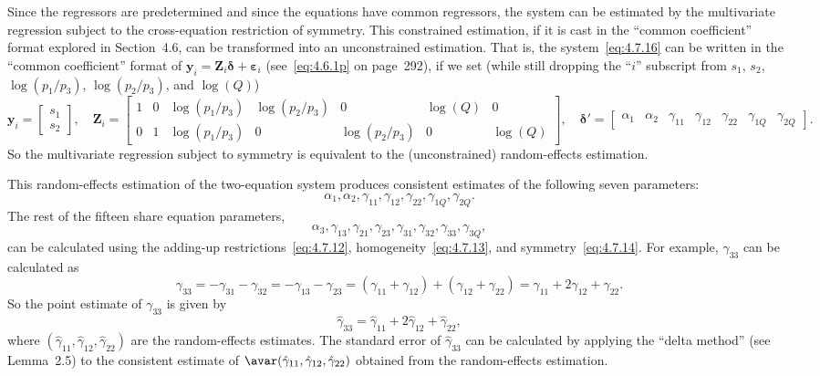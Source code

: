 Since the regressors are predetermined and since the equations have common
regressors, the system can be estimated by the multivariate regression subject to
the cross-equation restriction of symmetry. This constrained estimation, if it is cast
in the ``common coefficient'' format explored in Section~4.6, can be transformed
into an unconstrained estimation. That is, the system~\eqref{eq:4.7.16} can be
written in the ``common coefficient'' format of
$\mathbf{y}_i = \mathbf{Z}_i \boldsymbol{\delta} + \boldsymbol{\varepsilon}_i$
(see~\eqref{eq:4.6.1p} on page~292), if we set (while still dropping the ``$i$''
subscript from $s_1$, $s_2$, $\log(p_1/p_3)$, $\log(p_2/p_3)$, and $\log(Q)$)
\begin{equation}
\mathbf{y}_i = \begin{bmatrix} s_1 \\ s_2 \end{bmatrix}, \quad
\mathbf{Z}_i = \begin{bmatrix}
1 & 0 & \log(p_1/p_3) & \log(p_2/p_3) & 0 & \log(Q) & 0 \\
0 & 1 & \log(p_1/p_3) & 0 & \log(p_2/p_3) & 0 & \log(Q)
\end{bmatrix},
\quad
\boldsymbol{\delta}' = \begin{bmatrix}
\alpha_1 & \alpha_2 & \gamma_{11} & \gamma_{12} & \gamma_{22} &
\gamma_{1Q} & \gamma_{2Q}
\end{bmatrix}.
\label{eq:4.7.17}
\end{equation}
So the multivariate regression subject to symmetry is equivalent to the (unconstrained)
random-effects estimation.

This random-effects estimation of the two-equation system produces consistent
estimates of the following seven parameters:
\[
\alpha_1, \alpha_2, \gamma_{11}, \gamma_{12}, \gamma_{22},
\gamma_{1Q}, \gamma_{2Q}.
\]
The rest of the fifteen share equation parameters,
\[
\alpha_3, \gamma_{13}, \gamma_{21}, \gamma_{23}, \gamma_{31}, \gamma_{32},
\gamma_{33}, \gamma_{3Q},
\]
can be calculated using the adding-up restrictions~\eqref{eq:4.7.12},
homogeneity~\eqref{eq:4.7.13}, and symmetry~\eqref{eq:4.7.14}.
For example, $\gamma_{33}$ can be calculated as
\[
\gamma_{33} = -\gamma_{31} - \gamma_{32}
= -\gamma_{13} - \gamma_{23}
= (\gamma_{11} + \gamma_{12}) + (\gamma_{12} + \gamma_{22})
= \gamma_{11} + 2\gamma_{12} + \gamma_{22}.
\]
So the point estimate of $\gamma_{33}$ is given by
\[
\hat{\gamma}_{33} = \hat{\gamma}_{11} + 2\hat{\gamma}_{12} + \hat{\gamma}_{22},
\]
where $(\hat{\gamma}_{11}, \hat{\gamma}_{12}, \hat{\gamma}_{22})$ are the
random-effects estimates. The standard error of $\hat{\gamma}_{33}$
can be calculated by applying the ``delta method'' (see Lemma~2.5) to the
consistent estimate of
$\avar(\hat{\gamma}_{11}, \hat{\gamma}_{12}, \hat{\gamma}_{22})$ obtained from the
random-effects estimation.

